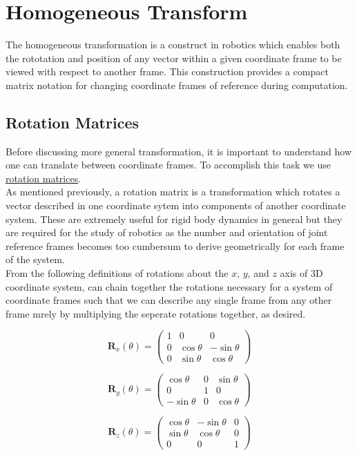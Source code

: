 \section*{Homogeneous Transform}

The homogeneous transformation is a construct in robotics which enables both the rototation and position of any vector within a given coordinate frame to be viewed with respect to another frame. This construction provides a compact matrix notation for changing coordinate frames of reference during computation.


\subsection*{Rotation Matrices}

Before discussing more general transformation, it is important to understand how one can translate between coordinate frames. To accomplish this task we use \underline{rotation matrices}. \\

\noindent As mentioned previously, a rotation matrix is a transformation which rotates a vector described in one coordinate sytem into components of another coordinate system. These are extremely useful for rigid body dynamics in general but they are required for the study of robotics as the number and orientation of joint reference frames becomes too cumbersum to derive geometrically for each frame of the system.\\

\noindent From the following definitions of rotations about the $x$, $y$, and $z$ axis of 3D coordinate system, can chain together the rotations necessary for a system of coordinate frames such that we can describe any single frame from any other frame mrely by multiplying the seperate rotations together, as desired.

\begin{center}
  $$
  \mathbf{R}_{x}(\theta)=\left(\begin{array}{ccc}
  1 & 0 & 0 \\
  0 & \cos \theta & -\sin \theta \\
  0 & \sin \theta & \cos \theta
  \end{array}\right)
  $$


  $$
  \mathbf{R}_{y}(\theta)=\left(\begin{array}{ccc}
  \cos \theta & 0 & \sin \theta \\
  0 & 1 & 0 \\
  -\sin \theta & 0 & \cos \theta
  \end{array}\right)
  $$

  $$
\mathbf{R}_{z}(\theta)=\left(\begin{array}{ccc}
\cos \theta & -\sin \theta & 0 \\
\sin \theta & \cos \theta & 0 \\
0 & 0 & 1
\end{array}\right)
$$
\end{center}



